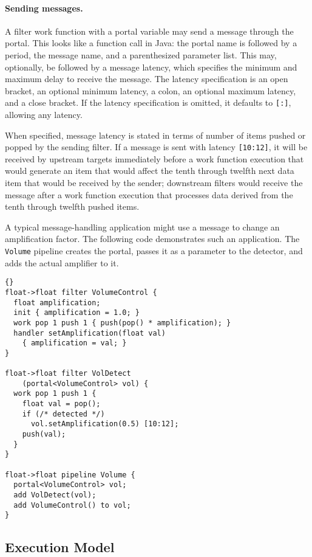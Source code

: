 \documentclass[11pt]{article}
\begin{document}
\paragraph{Sending messages.}  A filter work function with a portal
variable may send a message through the portal.  This looks like a
function call in Java: the portal name is followed by a period, the
message name, and a parenthesized parameter list.  This may,
optionally, be followed by a message latency, which specifies the
minimum and maximum delay to receive the message.  The latency
specification is an open bracket, an optional minimum latency, a
colon, an optional maximum latency, and a close bracket.  If the
latency specification is omitted, it defaults to \lstinline|[:]|,
allowing any latency.

When specified, message latency is stated in terms of number of items
pushed or popped by the sending filter.  If a message is sent with
latency \lstinline|[10:12]|, it will be received by upstream targets
immediately before a work function execution that would generate an
item that would affect the tenth through twelfth next data item that
would be received by the sender; downstream filters would receive the
message after a work function execution that processes data derived
from the tenth through twelfth pushed items.

A typical message-handling application might use a message to change
an amplification factor.  The following code demonstrates such an
application.  The \lstinline|Volume| pipeline creates the portal,
passes it as a parameter to the detector, and adds the actual
amplifier to it.

\begin{lstlisting}{}
float->float filter VolumeControl {
  float amplification;
  init { amplification = 1.0; }
  work pop 1 push 1 { push(pop() * amplification); }
  handler setAmplification(float val)
    { amplification = val; }
}

float->float filter VolDetect
    (portal<VolumeControl> vol) {
  work pop 1 push 1 {
    float val = pop();
    if (/* detected */)
      vol.setAmplification(0.5) [10:12];
    push(val);
  }
}

float->float pipeline Volume {
  portal<VolumeControl> vol;
  add VolDetect(vol);
  add VolumeControl() to vol;
}
\end{lstlisting}

\subsection{Execution Model}
\end{document}

